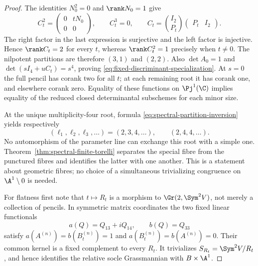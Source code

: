 \begin{proof}
The identities \(N_0^2=0\) and \(\rank N_0=1\) give
\begin{equation}\label{eq:rank-preserving-power-identities}
 C_t^2=\begin{pmatrix}0&tN_0\\0&0\end{pmatrix},\qquad
 C_t^3=0,\qquad
 C_t=\binom{I_2}{P_t}\begin{pmatrix}P_t&I_2\end{pmatrix}.
\end{equation}
The right factor in the last expression is surjective and the left
factor is injective.  Hence \(\rank C_t=2\) for every \(t\),
whereas \(\rank C_t^2=1\) precisely when \(t\ne0\).
The nilpotent partitions are therefore \((3,1)\) and \((2,2)\).
Also \(\det A_0=1\) and \(\det(sI_4+uC_t)=s^4\),
proving \eqref{eq:fixed-discriminant-specialization}.  At \(s=0\)
the full pencil has corank two for all \(t\); at each remaining
root it has corank one, and elsewhere corank zero.  Equality of these
functions on \(\Pj^1(\C)\) implies equality of the reduced
closed determinantal subschemes for each minor size.

At the unique multiplicity-four root, formula
\eqref{eq:spectral-partition-inversion} yields respectively
\[
 (\ell_1,\ell_2,\ell_3,\ldots)=(2,3,4,\ldots),
 \qquad (2,4,4,\ldots).
\]
No automorphism of the parameter line can exchange this root with a
simple one.  Theorem~\ref{thm:spectral-finite-torelli} separates
the special fibre from the punctured fibres and identifies the latter
with one another.  This is a statement about geometric fibres; no
choice of a simultaneous trivializing congruence on \(\A^1\setminus0\)
is needed.

For flatness first note that \(t\mapsto R_t\) is a morphism
to \(\Gr(2,\Sym^2V)\), not merely a collection of pencils.
In symmetric matrix coordinates the two fixed linear functionals
\[
 a(Q)=Q_{13}+iQ_{14},\qquad b(Q)=Q_{33}
\]
satisfy \(a(A^{(n)})=b(B_t^{(n)})=1\) and
\(a(B_t^{(n)})=b(A^{(n)})=0\).  Their common kernel is a
fixed complement to every \(R_t\).  It trivializes
\(S_{R_t}=\Sym^2V/R_t\), and hence identifies the relative
socle Grassmannian with \(B\times\A^1\).


\end{proof}
